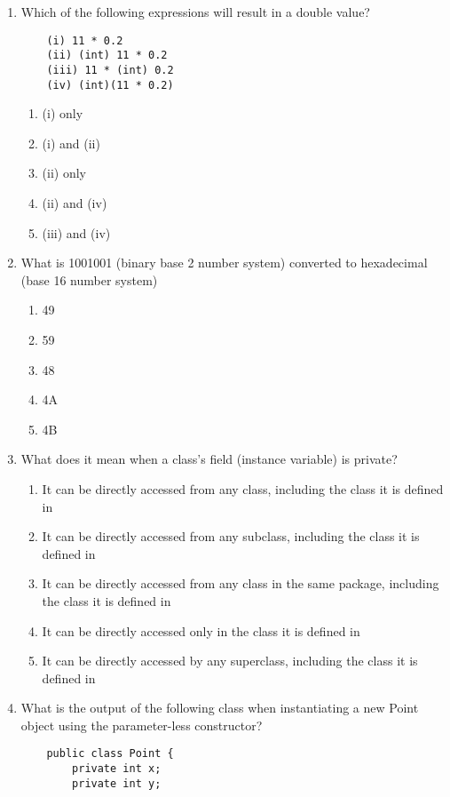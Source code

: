 \documentclass[S17-Final.tex]{subfiles}
\begin{document}
\begin{enumerate}
\item Which of the following expressions will result in a double value?
\begin{lstlisting}
    (i) 11 * 0.2
    (ii) (int) 11 * 0.2
    (iii) 11 * (int) 0.2
    (iv) (int)(11 * 0.2)
\end{lstlisting}
	
\begin{enumerate}
\item  (i) only
\item  (i) and (ii)
\item  (ii) only
\item  (ii) and (iv)
\item  (iii) and (iv)
\end{enumerate}

\item What is 1001001 (binary base 2 number system) converted to hexadecimal (base 16 number system)
	
\begin{enumerate}
\item  49
\item  59
\item  48
\item  4A
\item  4B
\end{enumerate}

\item What does it mean when a class's field (instance variable) is private?
	
\begin{enumerate}
\item  It can be directly accessed from any class, including the class it is defined in
\item  It can be directly accessed from any subclass, including the class it is defined in
\item  It can be directly accessed from any class in the same package, including the class it is defined in
\item  It can be directly accessed only in the class it is defined in
\item  It can be directly accessed by any superclass, including the class it is defined in
\end{enumerate}
\clearpage

\item What is the output of the following class when instantiating a new Point object using the parameter-less constructor?
\begin{lstlisting}
    public class Point {
		private int x;
		private int y;
		

\end{lstlisting}
\end{enumerate}
\end{document}
